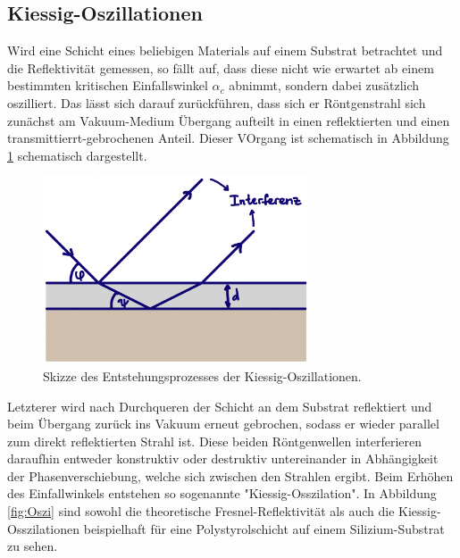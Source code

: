     \subsection{Kiessig-Oszillationen}
    \label{sec:KO}
        Wird eine Schicht eines beliebigen Materials auf einem Substrat betrachtet und die Reflektivität gemessen,
        so fällt auf, dass diese nicht wie erwartet ab einem bestimmten kritischen Einfallswinkel $\alpha_c$ abnimmt,
        sondern dabei zusätzlich oszilliert.
        Das lässt sich darauf zurückführen, dass sich er Röntgenstrahl sich zunächst am Vakuum-Medium Übergang
        aufteilt in einen reflektierten und einen transmittierrt-gebrochenen Anteil.
        Dieser VOrgang ist schematisch in Abbildung \ref{fig:Kiessig} schematisch dargestellt.
        \begin{figure}[h]
            \centering
            \includegraphics[width = 0.7\textwidth]{pictures/Kiessig.png}
            \caption{Skizze des Entstehungsprozesses der Kiessig-Oszillationen.}
            \label{fig:Kiessig}
        \end{figure}
        Letzterer wird nach Durchqueren der Schicht an dem Substrat reflektiert und beim Übergang zurück ins Vakuum erneut gebrochen,
        sodass er wieder parallel zum direkt reflektierten Strahl ist.
        Diese beiden Röntgenwellen interferieren daraufhin entweder konstruktiv oder destruktiv untereinander
        in Abhängigkeit der Phasenverschiebung, welche sich zwischen den Strahlen ergibt.
        Beim Erhöhen des Einfallwinkels entstehen so sogenannte "Kiessig-Osszilation".
        In Abbildung \ref{fig:Oszi} sind sowohl die theoretische Fresnel-Reflektivität als auch die Kiessig-Osszilationen
        beispielhaft für eine Polystyrolschicht auf einem Silizium-Substrat zu sehen.
